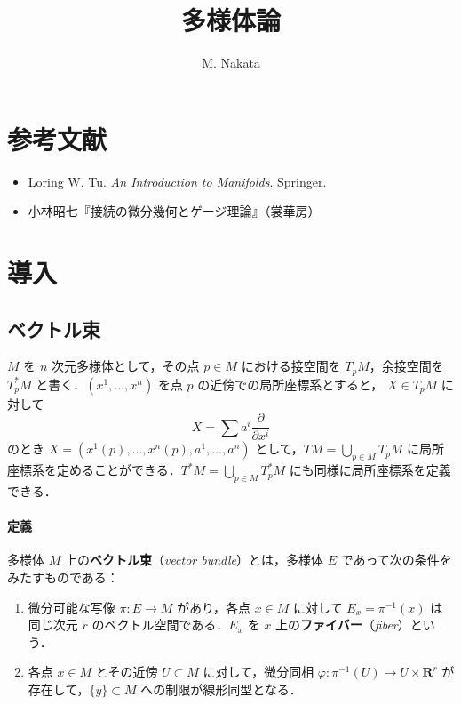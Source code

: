 \documentclass[b5paper,pandoc]{bxjsarticle}
\title{多様体論}
\author{M. Nakata}
\date{}
\providecommand{\tightlist}{%
  \setlength{\itemsep}{0pt}\setlength{\parskip}{0pt}}
\let\oldparagraph\paragraph
\renewcommand{\paragraph}[1]{\oldparagraph{#1}\mbox{}}
\begin{document}
\maketitle

{
\setcounter{tocdepth}{3}
\tableofcontents
}
\hypertarget{ux53c2ux8003ux6587ux732e}{%
\section{参考文献}\label{ux53c2ux8003ux6587ux732e}}

\begin{itemize}
\tightlist
\item
  Loring W. Tu. \emph{An Introduction to Manifolds}. Springer.
\item
  小林昭七『接続の微分幾何とゲージ理論』（裳華房）
\end{itemize}

\hypertarget{ux5c0eux5165}{%
\section{導入}\label{ux5c0eux5165}}

\hypertarget{ux30d9ux30afux30c8ux30ebux675f}{%
\subsection{ベクトル束}\label{ux30d9ux30afux30c8ux30ebux675f}}

\(M\) を \(n\) 次元多様体として，その点 \(p \in M\) における接空間を
\(T_pM\)，余接空間を \(T^*_p M\) と書く．\((x^1, \dotsc, x^n)\) を点
\(p\) の近傍での局所座標系とすると， \(X \in T_pM\) に対して \[
X = \sum a^i \frac{\partial }{\partial x^i}
\] のとき \(X = (x^1(p), \dotsc, x^n(p), a^1, \dotsc, a^n)\)
として，\(TM = \bigcup_{p \in M} T_pM\)
に局所座標系を定めることができる．\(T^*M = \bigcup_{p \in M} T^*_p M\)
にも同様に局所座標系を定義できる．

\hypertarget{ux5b9aux7fa9}{%
\paragraph{定義}\label{ux5b9aux7fa9}}

多様体 \(M\) 上の\textbf{ベクトル束}（\emph{vector bundle}）とは，多様体
\(E\) であって次の条件をみたすものである：

\begin{enumerate}
\def\labelenumi{\roman{enumi})}
\tightlist
\item
  微分可能な写像 \(\pi \colon E \to M\) があり，各点 \(x \in M\)
  に対して \(E_x = \pi^{-1}(x)\) は同じ次元 \(r\)
  のベクトル空間である．\(E_x\) を \(x\)
  上の\textbf{ファイバー}（\emph{fiber}）という．
\item
  各点 \(x \in M\) とその近傍 \(U \subset M\) に対して，微分同相
  \(\varphi \colon \pi^{-1}(U) \to U \times \boldsymbol{R}^r\)
  が存在して，\(\{ y \} \subset M\) への制限が線形同型となる．
\end{enumerate}
\end{document}
